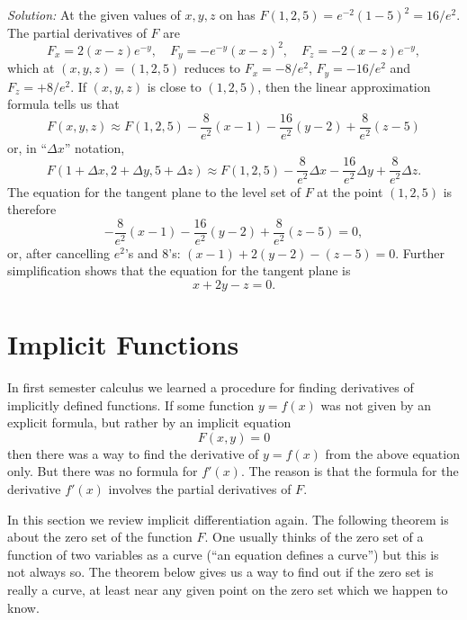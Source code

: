 \textit{Solution: } At the given values of $x, y, z$ on has $F(1, 2, 5) =
e^{-2}(1-5)^2 = 16/e^2$.  The partial derivatives of $F$ are
\[
F_x = 2(x-z)e^{-y}, \quad F_y = -e^{-y}(x-z)^2, \quad F_z = -2(x-z)e^{-y},
\]
which at $(x, y, z) = (1, 2, 5)$ reduces to $F_x = -8/e^2$, $F_y = -16/e^2$ and
$F_z = +8/e^2$.  If $(x, y, z)$ is close to $(1, 2, 5)$, then the linear
approximation formula tells us that
\[
F(x, y, z) \approx F(1, 2, 5) -\frac8{e^2} (x-1) -\frac{16}{e^2} (y-2) +
\frac8{e^2} (z-5)
\]
or, in ``$\Delta x$'' notation, %
\[
F(1+\Delta x, 2+\Delta y, 5+\Delta z) \approx F(1, 2, 5) -\frac8{e^2} \Delta x
-\frac{16}{e^2} \Delta y + \frac8{e^2} \Delta z.
\]
The equation for the tangent plane to the level set of $F$ at the point
$(1,2,5)$ is therefore
\[
-\frac8{e^2} (x-1) -\frac{16}{e^2} (y-2) + \frac8{e^2} (z-5)=0,
\]
or, after cancelling ${e^2}$'s and $8$'s: $(x-1) + 2(y-2) -(z-5) = 0$.  Further
simplification shows that the equation for the tangent plane is
\[
x+2y-z = 0.
\]

\section{Implicit Functions}
In first semester calculus we learned a procedure for finding derivatives of
implicitly defined functions.  If some function $y=f(x)$ was not given by an
explicit formula, but rather by an implicit equation
\begin{equation}
  F(x, y)=0
  \label{eq:implicit}
\end{equation}
then there was a way to find the derivative of $y=f(x)$ from the above equation
only.  But there was no formula for $f'(x)$.  The reason is that the formula for
the derivative $f'(x)$ involves the partial derivatives of $F$.

In this section we review implicit differentiation again.  The following theorem
is about the zero set of the function $F$.  One usually thinks of the zero set
of a function of two variables as a curve (``an equation defines a curve'') but
this is not always so.  The theorem below gives us a way to find out if the zero
set is really a curve, at least near any given point on the zero set which we
happen to know.

